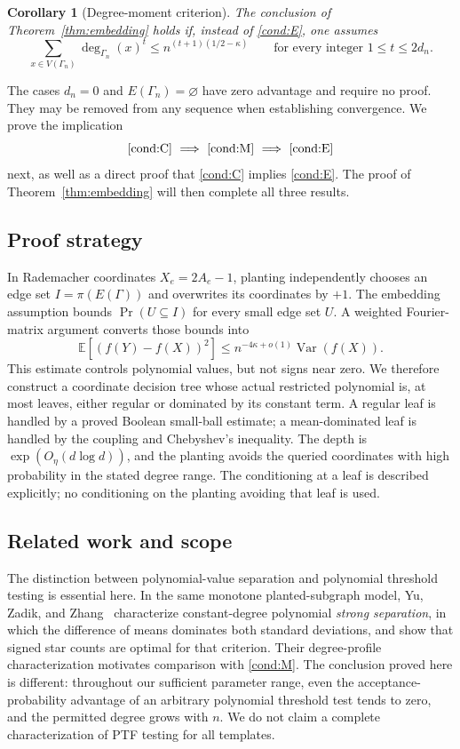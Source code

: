 \documentclass[11pt]{article}
\newcommand{\E}{\mathbb E}
\newcommand{\Var}{\operatorname{Var}}
\newcommand{\1}{\mathbf 1}
\newtheorem{corollary}[theorem]{Corollary}
\theoremstyle{definition}
\theoremstyle{remark}
\numberwithin{equation}{section}
\begin{document}
\begin{corollary}[Degree-moment criterion]\label{cor:moments}
The conclusion of Theorem~\ref{thm:embedding} holds if, instead of \eqref{cond:E}, one assumes
\begin{equation}\tag{M}\label{cond:M}
 \sum_{x\in V(\Gamma_n)}\deg_{\Gamma_n}(x)^t
 \le n^{(t+1)(1/2-\kappa)}
 \qquad\text{for every integer }1\le t\le2d_n.
\end{equation}
\end{corollary}

The cases $d_n=0$ and $E(\Gamma_n)=\varnothing$ have zero advantage and require no proof. They may be removed from any sequence when establishing convergence. We prove the implication
\[
 \eqref{cond:C}\ \Longrightarrow\ \eqref{cond:M}
 \ \Longrightarrow\ \eqref{cond:E}
\]
next, as well as a direct proof that \eqref{cond:C} implies \eqref{cond:E}. The proof of Theorem~\ref{thm:embedding} will then complete all three results.

\subsection{Proof strategy}
In Rademacher coordinates $X_e=2A_e-1$, planting independently chooses an edge set $I=\pi(E(\Gamma))$ and overwrites its coordinates by $+1$. The embedding assumption bounds $\Pr(U\subseteq I)$ for every small edge set $U$. A weighted Fourier-matrix argument converts those bounds into
\[
 \E[(f(Y)-f(X))^2]\le n^{-4\kappa+o(1)}\Var(f(X)).
\]
This estimate controls polynomial values, but not signs near zero. We therefore construct a coordinate decision tree whose actual restricted polynomial is, at most leaves, either regular or dominated by its constant term. A regular leaf is handled by a proved Boolean small-ball estimate; a mean-dominated leaf is handled by the coupling and Chebyshev's inequality. The depth is $\exp(O_\eta(d\log d))$, and the planting avoids the queried coordinates with high probability in the stated degree range. The conditioning at a leaf is described explicitly; no conditioning on the planting avoiding that leaf is used.


\subsection{Related work and scope}
The distinction between polynomial-value separation and polynomial threshold testing is essential here. In the same monotone planted-subgraph model, Yu, Zadik, and Zhang~\cite{YZZ} characterize constant-degree polynomial \emph{strong separation}, in which the difference of means dominates both standard deviations, and show that signed star counts are optimal for that criterion. Their degree-profile characterization motivates comparison with \eqref{cond:M}. The conclusion proved here is different: throughout our sufficient parameter range, even the acceptance-probability advantage of an arbitrary polynomial threshold test tends to zero, and the permitted degree grows with $n$. We do not claim a complete characterization of PTF testing for all templates.
\end{document}
